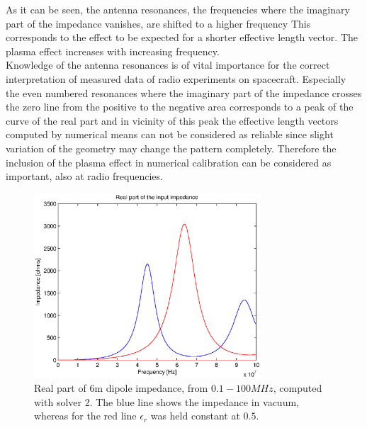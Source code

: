 \documentclass[draft,ras]{agutex}
\begin{document}
\begin{article}
As it can be seen, the antenna resonances, the frequencies where the imaginary part of the impedance vanishes, are shifted to a higher frequency This corresponds to the effect to be expected for a shorter effective length vector. The plasma effect increases with increasing frequency.\\

Knowledge of the antenna resonances is of vital importance for the correct interpretation of measured data of radio experiments on spacecraft. Especially the even numbered resonances where the imaginary part of the impedance crosses the zero line from the positive to the negative area corresponds to a peak of the curve of the real part and in vicinity of this peak the effective length vectors computed by numerical means can not be considered as reliable since slight variation of the geometry may change the pattern completely. Therefore the inclusion of the plasma effect in numerical calibration can be considered as important, also at radio frequencies.\\


\begin{figure}
  \noindent\includegraphics[width=20pc]{imps_dipole_solver2_real.eps}
\caption{Real part of 6m dipole impedance, from $0.1 - 100 MHz$, computed with solver 2. The blue line shows the impedance in vacuum, whereas for the red line $\epsilon_r$ was held constant at $0.5$.}
\label{fig:impedances_dipole_solver2_real}
\end{figure}


\end{article}
\end{document}
